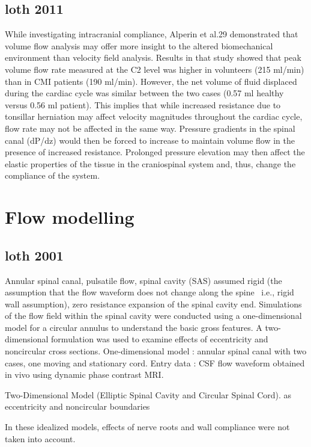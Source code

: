\documentclass{report}
\begin{document}
\subsection{loth 2011}

While investigating intracranial compliance,
Alperin et al.29 demonstrated that volume flow analysis
may offer more insight to the altered biomechanical
environment than velocity field analysis. Results
in that study showed that peak volume flow rate
measured at the C2 level was higher in volunteers
(215 ml/min) than in CMI patients (190 ml/min).
However, the net volume of fluid displaced during the
cardiac cycle was similar between the two cases
(0.57 ml healthy versus 0.56 ml patient). This implies
that while increased resistance due to tonsillar
herniation may affect velocity magnitudes throughout
the cardiac cycle, flow rate may not be affected
in the same way. Pressure gradients in the spinal
canal (dP/dz) would then be forced to increase to
maintain volume flow in the presence of increased
resistance. Prolonged pressure elevation may then
affect the elastic properties of the tissue in the
craniospinal system and, thus, change the compliance
of the system.

\section{Flow modelling}

\subsection{loth 2001}


Annular spinal canal, pulsatile flow, spinal cavity (SAS) assumed rigid (the assumption that the flow waveform does not change along the spine ~i.e., rigid wall assumption), zero resistance expansion of the spinal cavity end.
Simulations of the flow field within the spinal cavity were conducted
using a one-dimensional model for a circular annulus to
understand the basic gross features. A two-dimensional formulation
was used to examine effects of eccentricity and noncircular
cross sections.
One-dimensional model : annular spinal canal with two cases, one moving and stationary cord.
Entry data : CSF flow waveform obtained in vivo using dynamic phase contrast MRI.

Two-Dimensional Model (Elliptic Spinal Cavity and Circular
Spinal Cord). as eccentricity and noncircular boundaries

In these idealized models, effects of nerve roots and wall compliance
were not taken into account.
\end{document}
